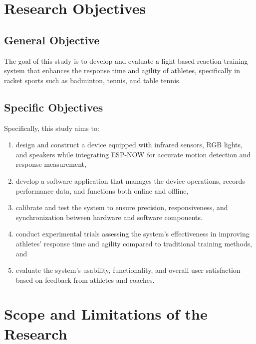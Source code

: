 \section{Research Objectives}
\label{sec:researchobjectives}

\subsection{General Objective}
\label{sec:generalobjective}

The goal of this study is to develop and evaluate a light-based reaction training system that enhances the response time and agility of athletes, specifically in racket sports such as badminton, tennis, and table tennis.

\subsection{Specific Objectives}
\label{sec:specificobjectives}

	Specifically, this study aims to:
	
	\begin{enumerate}
		
	   \item design and construct a device equipped with infrared sensors, RGB lights, and speakers while integrating ESP-NOW for accurate motion detection and response measurement,
	   
	   \item develop a software application that manages the device operations, records performance data, and functions both online and offline,
	   
	   \item calibrate and test the system to ensure precision, responsiveness, and synchronization between hardware and software components.
	   
	   \item conduct experimental trials assessing the system’s effectiveness in improving athletes’ response time and agility compared to traditional training methods, and
	   
	   \item evaluate the system’s usability, functionality, and overall user satisfaction based on feedback from athletes and coaches.
	   
	\end{enumerate}


\section{Scope and Limitations of the Research}
\label{sec:scopelimitations}

